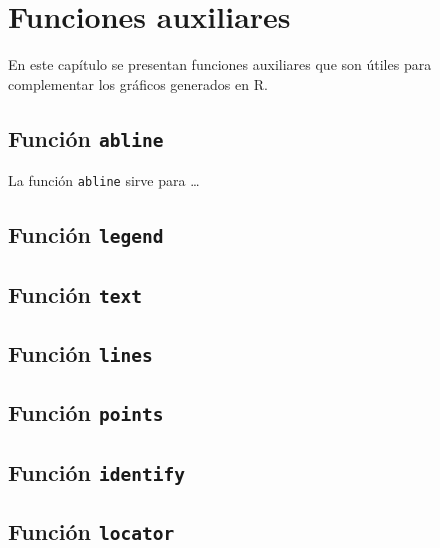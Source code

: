 \documentclass[10pt,]{krantz}
\let\proglang=\textsf
\begin{document}
\chapter{Funciones auxiliares}\label{funciones-auxiliares}

En este capítulo se presentan funciones auxiliares que son útiles para
complementar los gráficos generados en \proglang{R}.

\section{\texorpdfstring{Función \texttt{abline}
}{Función abline }}\label{funcion-abline}

La función \texttt{abline} sirve para \ldots{}

\section{\texorpdfstring{Función \texttt{legend} 
}{Función legend  }}\label{funcion-legend}

\section{\texorpdfstring{Función \texttt{text} 
}{Función text  }}\label{funcion-text}

\section{\texorpdfstring{Función \texttt{lines} 
}{Función lines  }}\label{funcion-lines}

\section{\texorpdfstring{Función \texttt{points} 
}{Función points  }}\label{funcion-points}

\section{\texorpdfstring{Función \texttt{identify} 
}{Función identify  }}\label{funcion-identify}

\section{\texorpdfstring{Función \texttt{locator}
}{Función locator }}\label{funcion-locator}
\end{document}
